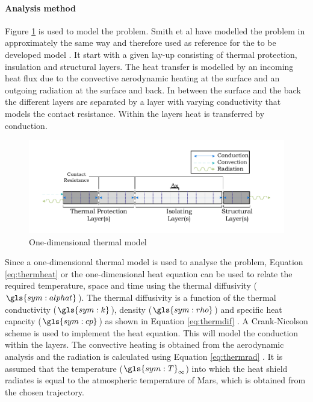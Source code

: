 \paragraph{Analysis method}
Figure \ref{fig:1dmodelthermal} is used to model the problem. Smith et al have modelled the problem in approximately the same way and therefore used as reference for the to be developed model \cite{Smith2011}. It start with a given lay-up consisting of thermal protection, insulation and structural layers. The heat transfer is modelled by an incoming heat flux due to the convective aerodynamic heating at the surface and an outgoing radiation at the surface and back. In between the surface and the back the different layers are separated by a layer with varying conductivity that models the contact resistance. Within the layers heat is transferred by conduction.

\begin{figure}[h]
	\centering
	\includegraphics{./Figure/Thermal/1dmodelthermal.pdf}
	\caption{One-dimensional thermal model}
	\label{fig:1dmodelthermal}
\end{figure}

Since a one-dimensional thermal model is used to analyse the problem, Equation \eqref{eq:thermheat} or the one-dimensional heat equation can be used to relate the required temperature, space and time using the thermal diffusivity ($\gls{sym:alphat}$). The thermal diffusivity is a function of the thermal conductivity ($\gls{sym:k}$), density ($\gls{sym:rho}$) and specific heat capacity ($\gls{sym:cp}$) as shown in Equation \eqref{eq:thermdif} \cite{Holman2002}. A Crank-Nicolson scheme is used to implement the heat equation. This will model the conduction within the layers. The convective heating is obtained from the aerodynamic analysis and the radiation is calculated using Equation \eqref{eq:thermrad} \cite{Holman2002}. It is assumed that the temperature ($\gls{sym:T}_\infty$) into which the heat shield radiates is equal to the atmospheric temperature of Mars, which is obtained from the chosen trajectory.

